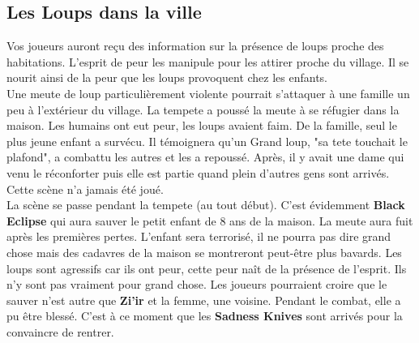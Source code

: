 \documentclass[oneside,12pt]{book}
\newcommand{\BlackEclipse}{\textbf{Black Eclipse} }
\newcommand{\Thomas}{\textbf{Zi'ir} }
\newcommand{\Sadness}{\textbf{Sadness Knives} }
\begin{document}
\begin{flushleft}
\section{Les Loups dans la ville}
Vos joueurs auront reçu des information sur la présence de loups proche des habitations. 
L'esprit de peur les manipule pour les attirer proche du village. Il se nourit ainsi de la peur que les loups provoquent chez les enfants. \\
Une meute de loup particulièrement violente pourrait s'attaquer à une famille un peu à l'extérieur du village.
La tempete a poussé la meute à se réfugier dans la maison. Les humains ont eut peur, les loups avaient faim. 
De la famille, seul le plus jeune enfant a survécu. Il témoignera qu'un Grand loup, "sa tete touchait le plafond", a combattu les autres et les a repoussé. Après, il y avait une dame qui venu le réconforter puis elle est partie quand plein d'autres gens sont arrivés. \\
Cette scène n'a jamais été joué.\\
La scène se passe pendant la tempete (au tout début). C'est évidemment \BlackEclipse qui aura sauver le petit enfant de 8 ans de la maison. La meute aura fuit après les premières pertes. L'enfant sera terrorisé, il ne pourra pas dire grand chose mais des cadavres de la maison se montreront peut-être plus bavards. 
Les loups sont agressifs car ils ont peur, cette peur naît de la présence de l'esprit. Ils n'y sont pas vraiment pour grand chose. 
Les joueurs pourraient croire que le sauver n'est autre que \Thomas et la femme, une voisine. Pendant le combat, elle a pu être blessé. C'est à ce moment que les \Sadness sont arrivés pour la convaincre de rentrer. 



\end{flushleft}
\end{document}
